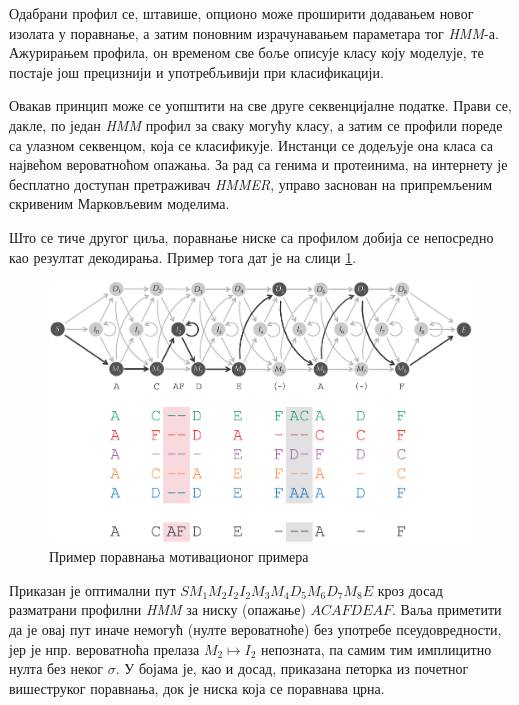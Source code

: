 \documentclass[12pt,oneside]{memoir}
\begin{document}
\begin{CJK}{UTF8}{ipxm}
Одабрани профил се, штавише, опционо може проширити додавањем новог изолата у поравнање, а затим поновним израчунавањем параметара тог \textit{HMM}-а. Ажурирањем профила, он временом све боље описује класу коју моделује, те постаје још прецизнији и употребљивији при класификацији.

Овакав принцип може се уопштити на све друге секвенцијалне податке. Прави се, дакле, по један \textit{HMM} профил за сваку могућу класу, а затим се профили пореде са улазном секвенцом, која се класификује. Инстанци се додељује она класа са највећом вероватноћом опажања. За рад са генима и протеинима, на интернету је бесплатно доступан претраживач \textit{HMMER}\cite{hmmer}, управо заснован на припремљеним скривеним Марковљевим моделима.

Што се тиче другог циља, поравнање ниске са профилом добија се непосредно као резултат декодирања. Пример тога дат је на слици \ref{fig:poravnanje}.

\begin{figure}[H]
  \centering
  \includegraphics[width=\textwidth]{poravnanje.png}
  \caption{Пример поравнања мотивационог примера\cite{compeau2015}}
  \label{fig:poravnanje}
\end{figure}

Приказан је оптимални пут $S M_1 M_2 I_2 I_2 M_3 M_4 D_5 M_6 D_7 M_8 E$ кроз досад разматрани профилни \textit{HMM} за ниску (опажање) $ACAFDEAF$. Ваља приметити да је овај пут иначе немогућ (нулте вероватноће) без употребе псеудовредности, јер је нпр. вероватноћа прелаза $M_2 \mapsto I_2$ непозната, па самим тим имплицитно нулта без неког $\sigma$. У бојама је, као и досад, приказана петорка из почетног вишеструког поравнања, док је ниска која се поравнава црна.


\end{CJK}
\end{document}
